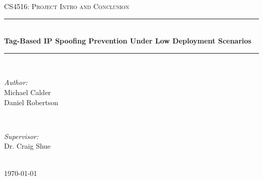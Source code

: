 \documentclass[12pt]{article} %
\begin{document}

\begin{titlepage}

\newcommand{\HRule}{\rule{\linewidth}{0.5mm}} %

\center %

\textsc{\LARGE CS4516: Project Intro and Conclusion}\\[1.5cm] %

\HRule \\[0.4cm]
{ \huge \bfseries Tag-Based IP Spoofing Prevention Under Low Deployment Scenarios}\\[0.4cm] %
\HRule \\[1.5cm]

\begin{minipage}{0.4\textwidth}
\begin{flushleft} \large
\emph{Author:}\\
Michael Calder\\
Daniel Robertson\\
\end{flushleft}
\end{minipage}
~
\begin{minipage}{0.4\textwidth}
\begin{flushright} \large
\emph{Supervisor:} \\
Dr. Craig Shue %
\end{flushright}
\end{minipage}\\[4cm]

{\large \today}\\[3cm] %


\vfill %

\end{titlepage}

\end{document}
